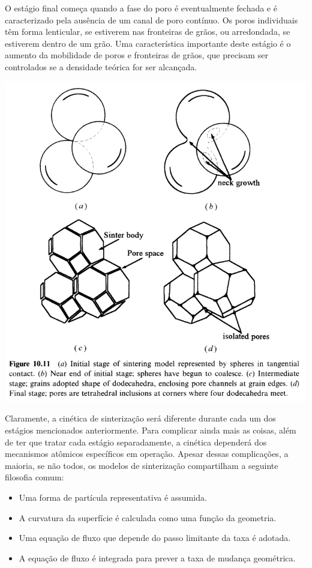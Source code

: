 O estágio final começa quando a fase do poro é eventualmente fechada e é caracterizado pela ausência de um canal de poro contínuo. Os poros individuais têm forma lenticular, se estiverem nas fronteiras de grãos, ou arredondada, se estiverem dentro de um grão. Uma característica importante deste estágio é o aumento da mobilidade de poros e fronteiras de grãos, que precisam ser controlados se a densidade teórica for ser alcançada.

\begin{center}
    \includegraphics*[scale=0.45]{./images/estagios_sinterizacao.png}
\end{center}

Claramente, a cinética de sinterização será diferente durante cada um dos estágios mencionados anteriormente. Para complicar ainda mais as coisas, além de ter que tratar cada estágio separadamente, a cinética dependerá dos mecanismos atômicos específicos em operação. Apesar dessas complicações, a maioria, se não todos, os modelos de sinterização compartilham a seguinte filosofia comum:

\begin{itemize}
    \item Uma forma de partícula representativa é assumida.
    \item A curvatura da superfície é calculada como uma função da geometria.
    \item Uma equação de fluxo que depende do passo limitante da taxa é adotada.
    \item A equação de fluxo é integrada para prever a taxa de mudança geométrica.
\end{itemize}

